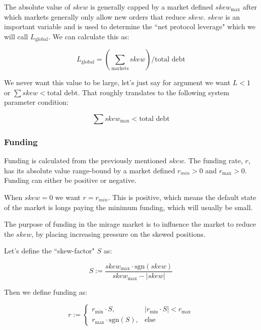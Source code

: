 \documentclass[letterpaper]{article}
\begin{document}
\begin{multicols}{2}
The absolute value of $skew$ is generally capped by a market defined $skew_{\text{max}}$ after which markets generally only allow new orders that reduce $skew$. $skew$ is an important variable and is used to determine the ``net protocol leverage" which we will call $L_{\text{global}}$. We can calculate this as:

\begin{equation}
    L_{\text{global}} = (\sum_{\text{markets}}skew) / \text{total debt} 
\end{equation}

We never want this value to be large, let's just say for argument we want $L < 1$ or $\sum skew < \text{total debt}$. That roughly translates to the following system parameter condition:

\begin{equation}
    \sum skew_{\text{max}} < \text{total debt}
\end{equation}

\subsubsection{Funding}

Funding is calculated from the previously mentioned $skew$. The funding rate, $r$, has its absolute value range-bound by a market defined $r_{min} > 0$ and $r_{\text{max}} > 0$. Funding can either be positive or negative.

When $skew=0$ we want $r=r_{min}$. This is positive, which means the default state of the market is longs paying the minimum funding, which will usually be small.

The purpose of funding in the mirage market is to influence the market to reduce the $skew$, by placing increasing pressure on the skewed positions. 

Let's define the ``skew-factor" $S$ as:

\begin{equation}
    \label{eq:skew-factor}
    S := \frac{skew_{\text{max}} \cdot \text{sgn}(skew)}{skew_{\text{max}} - |skew|}
\end{equation}

Then we define funding as:

\begin{equation}
    \label{eq:funding}
    r := \begin{cases}
        r_{\text{min}} \cdot S, & |r_{\text{min}} \cdot S| < r_{\text{max}} \\
        r_{\text{max}} \cdot \text{sgn}(S), & \text{else}
    \end{cases}
\end{equation}


\end{multicols}
\end{document}
